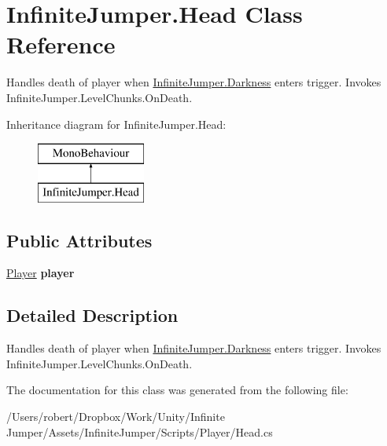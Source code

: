 \hypertarget{class_infinite_jumper_1_1_head}{}\section{Infinite\+Jumper.\+Head Class Reference}
\label{class_infinite_jumper_1_1_head}


Handles death of player when \hyperlink{class_infinite_jumper_1_1_darkness}{Infinite\+Jumper.\+Darkness} enters trigger. Invokes Infinite\+Jumper.\+Level\+Chunks.\+On\+Death.  


Inheritance diagram for Infinite\+Jumper.\+Head\+:\begin{figure}[H]
\begin{center}
\leavevmode
\includegraphics[height=2.000000cm]{class_infinite_jumper_1_1_head}
\end{center}
\end{figure}
\subsection*{Public Attributes}
\begin{DoxyCompactItemize}
\item 
\hypertarget{class_infinite_jumper_1_1_head_a2030e19a23408c3a9dedfd73ba2ff023}{}\hyperlink{class_infinite_jumper_1_1_player}{Player} {\bfseries player}\label{class_infinite_jumper_1_1_head_a2030e19a23408c3a9dedfd73ba2ff023}

\end{DoxyCompactItemize}


\subsection{Detailed Description}
Handles death of player when \hyperlink{class_infinite_jumper_1_1_darkness}{Infinite\+Jumper.\+Darkness} enters trigger. Invokes Infinite\+Jumper.\+Level\+Chunks.\+On\+Death. 



The documentation for this class was generated from the following file\+:\begin{DoxyCompactItemize}
\item 
/\+Users/robert/\+Dropbox/\+Work/\+Unity/\+Infinite Jumper/\+Assets/\+Infinite\+Jumper/\+Scripts/\+Player/Head.\+cs\end{DoxyCompactItemize}
